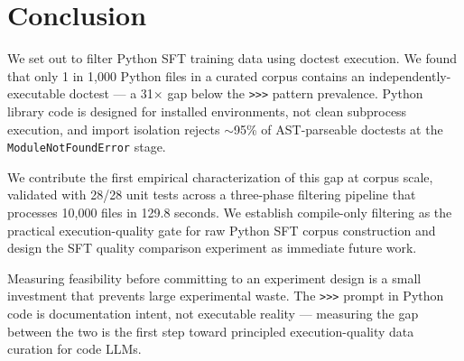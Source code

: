 \section{Conclusion}
\label{sec:conclusion}

We set out to filter Python SFT training data using doctest execution. We found that only
1 in 1,000 Python files in a curated corpus contains an independently-executable doctest ---
a 31$\times$ gap below the \texttt{>>>} pattern prevalence. Python library code is designed for
installed environments, not clean subprocess execution, and import isolation rejects $\sim$95\%
of AST-parseable doctests at the \texttt{ModuleNotFoundError} stage.

We contribute the first empirical characterization of this gap at corpus scale, validated
with 28/28 unit tests across a three-phase filtering pipeline that processes 10,000 files
in 129.8 seconds. We establish compile-only filtering as the practical execution-quality
gate for raw Python SFT corpus construction and design the SFT quality comparison experiment
as immediate future work.

Measuring feasibility before committing to an experiment design is a small investment that
prevents large experimental waste. The \texttt{>>>} prompt in Python code is documentation
intent, not executable reality --- measuring the gap between the two is the first step toward
principled execution-quality data curation for code LLMs.
